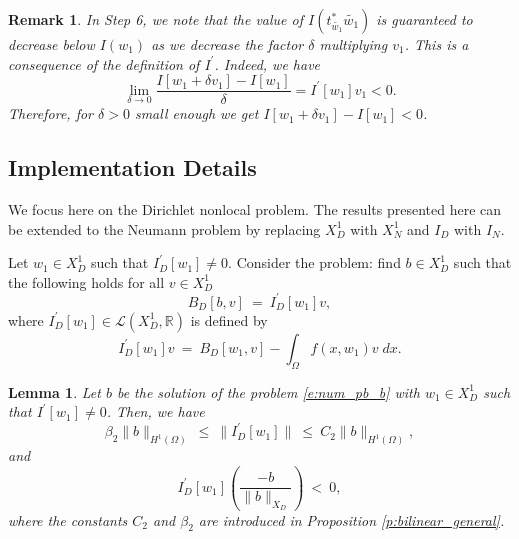 \documentclass[11pt]{amsart}   	%
\theoremstyle{plain}
\numberwithin{equation}{section}
\newtheorem{lemma}[thm]{Lemma}
\newtheorem{remark}[thm]{Remark}
\begin{document}
\begin{remark}\label{remark:algo_step6}
In Step 6, we note that the value of $I(t^*_{\tilde{w_1}} \tilde{w_1})$ is guaranteed to decrease below $I(w_1)$ as we decrease the factor $\delta$ multiplying $v_1$. This is a consequence of the definition of $I^\prime$. Indeed, we have
$$\lim_{\delta\rightarrow 0} \frac{I[w_1 + \delta v_1] - I[w_1]}{\delta} = I^\prime[w_1] v_1 < 0.$$
Therefore, for $\delta>0$ small enough we get $I[w_1 + \delta v_1] - I[w_1] < 0$.
\end{remark}


\subsection{Implementation Details}

We focus here on the Dirichlet nonlocal problem. The results presented here can be extended to the Neumann problem by replacing $X_D^1$ with $X_N^1$ and $I_D$ with $I_N$. 

Let $w_1\in X_D^1$ such that $I_D^\prime[w_1]\neq 0$. Consider the problem: find $b \in X_D^1$ such that the following holds for all $v\in X_D^1$
\begin{equation}\label{e:num_pb_b}
    B_D[b,v] \ = \ I_D^\prime[w_1]v,
\end{equation}
where $I^\prime_D[w_1] \in \mathcal{L}(X_D^1,\mathbb{R})$ is defined by
$$I^\prime_D[w_1]v 
\ = \  B_D[w_1,v] - \int_\Omega f(x,w_1)v \;dx.$$


\begin{lemma}\label{lemma:num_algo_details}
Let $b$ be the solution of the problem \ref{e:num_pb_b} with $w_1\in X_D^1$ such that $I^\prime[w_1]\neq 0$.
Then, we have
\begin{equation}\label{lemma:num_bound_Iprime}
\beta_2 \| b\|_{H^1(\Omega)} \ \leq \ \|I_D^\prime[w_1]\| \ \leq \ C_2 \| b\|_{H^1(\Omega)},
\end{equation}
and
$$ I_D^\prime[w_1] \left(\frac{-b}{\|b\|_{X_D}}\right) \ < \ 0,$$
where the constants $C_2$ and $\beta_2$ are introduced in Proposition \ref{p:bilinear_general}.
\end{lemma}
\end{document}
